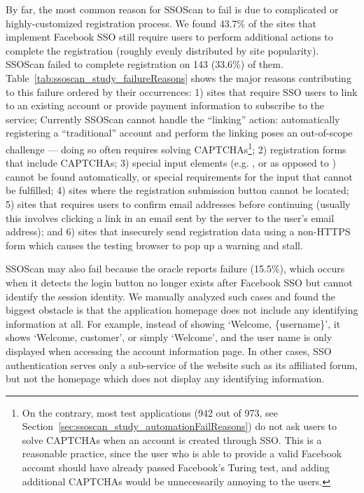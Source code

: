  By far, the most common reason for SSOScan to fail is due to complicated or highly-customized registration process.  We found 43.7\% of the sites that implement Facebook SSO still require users to perform additional actions to complete the registration (roughly evenly distributed by site popularity).  SSOScan failed to complete registration on 143 (33.6\%) of them.  Table~\ref{tab:ssoscan_study_failureReasons} shows the major reasons contributing to this failure ordered by their occurrences: 1) sites that require SSO users to link to an existing account or provide payment information to subscribe to the service; Currently SSOScan cannot handle the ``linking'' action: automatically registering a ``traditional'' account and perform the linking poses an out-of-scope challenge --- doing so often requires solving CAPTCHAs\footnote{On the contrary, most test applications (942 out of 973, see Section~\ref{sec:ssoscan_study_automationFailReasons}) do not ask users to solve CAPTCHAs when an account is created through SSO.  This is a reasonable practice, since the user who is able to provide a valid Facebook account should have already passed Facebook's Turing test, and adding additional CAPTCHAs would be unnecessarily annoying to the users.}; 2) registration forms that include CAPTCHAs; 3) special input elements (e.g. ,  or  as opposed to ) cannot be found automatically, or special requirements for the input that cannot be fulfilled; 4) sites where the registration submission button cannot be located; 5) sites that requires users to confirm email addresses before continuing (usually this involves clicking a link in an email sent by the server to the user's email address); and 6) sites that insecurely send registration data using a non-HTTPS form which causes the testing browser to pop up a warning and stall.



 SSOScan may also fail because the oracle reports failure (15.5\%), which occurs when it detects the login button no longer exists after Facebook SSO but cannot identify the session identity.  We manually analyzed such cases and found the biggest obstacle is that the application homepage does not include any identifying information at all.  For example, instead of showing `Welcome, \{username\}', it shows `Welcome, customer', or simply `Welcome', and the user name is only displayed when accessing the account information page.  In other cases, SSO authentication serves only a sub-service of the website such as its affiliated forum, but not the homepage which does not display any identifying information.

